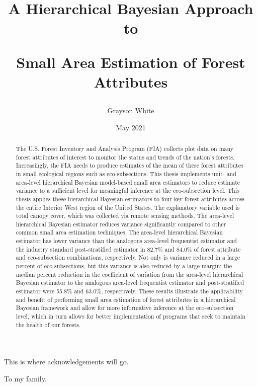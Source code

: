 \documentclass[12pt,twoside]{reedthesis}
\title{A Hierarchical Bayesian Approach to

Small Area Estimation of Forest Attributes}
\author{Grayson White}
\date{May 2021}
\begin{document}
  \maketitle

\frontmatter %
\pagestyle{empty} %
  \begin{acknowledgements}
    This is where acknowledgements will go.
  \end{acknowledgements}

  \hypersetup{linkcolor=black}
  \setcounter{secnumdepth}{2}
  \setcounter{tocdepth}{2}
  \tableofcontents

  \listoftables

  \listoffigures
  \begin{abstract}
    The U.S. Forest Inventory and Analysis Program (FIA) collects plot data on many forest attributes of interest to monitor the status and trends of the nation's forests. Increasingly, the FIA needs to produce estimates of the mean of these forest attributes in small ecological regions such as eco-subsections. This thesis implements unit- and area-level hierarchical Bayesian model-based small area estimators to reduce estimate variance to a sufficient level for meaningful inference at the eco-subsection level. This thesis applies these hierarchical Bayesian estimators to four key forest attributes across the entire Interior West region of the United States. The explanatory variable used is total canopy cover, which was collected via remote sensing methods. The area-level hierarchical Bayesian estimator reduces variance significantly compared to other common small area estimation techniques. The area-level hierarchical Bayesian estimator has lower variance than the analogous area-level frequentist estimator and the industry standard post-stratified estimator in 82.7\% and 84.0\% of forest attribute and eco-subsection combinations, respectively. Not only is variance reduced in a large percent of eco-subsections, but this variance is also reduced by a large margin: the median percent reduction in the coefficient of variation from the area-level hierarchical Bayesian estimator to the analogous area-level frequentist estimator and post-stratified estimator were 55.8\% and 63.0\%, respectively. These results illustrate the applicability and benefit of performing small area estimation of forest attributes in a hierarchical Bayesian framework and allow for more informative inference at the eco-subsection level, which in turn allows for better implementation of programs that seek to maintain the health of our forests.
  \end{abstract}
  \begin{dedication}
    To my family.
  \end{dedication}
\mainmatter %
\pagestyle{fancyplain} %
\end{document}
